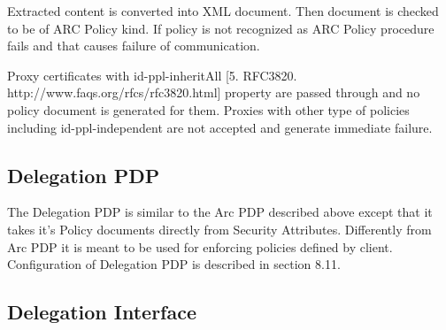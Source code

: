 \documentclass{article}                            %
\begin{document}
Extracted content is converted into XML document. Then document is checked to be of ARC Policy kind. If policy is not recognized as ARC Policy procedure fails and that causes failure of communication.

Proxy certificates with id-ppl-inheritAll [5. RFC3820. http://www.faqs.org/rfcs/rfc3820.html] property are passed through and no policy document is generated for them. Proxies with other type of policies including id-ppl-independent are not accepted and generate immediate failure.

\subsection{Delegation PDP} %
\label{subsec:delegation_pdp}
The Delegation PDP is similar to the Arc PDP described above except that it takes it's Policy documents directly from Security Attributes. Differently from Arc PDP it is meant to be used for enforcing policies defined by client. Configuration of Delegation PDP is described in section 8.11.

\subsection{Delegation Interface} %
\label{subsec:delegation_interface}

\begin{figure}
\end{figure}
\end{document}
